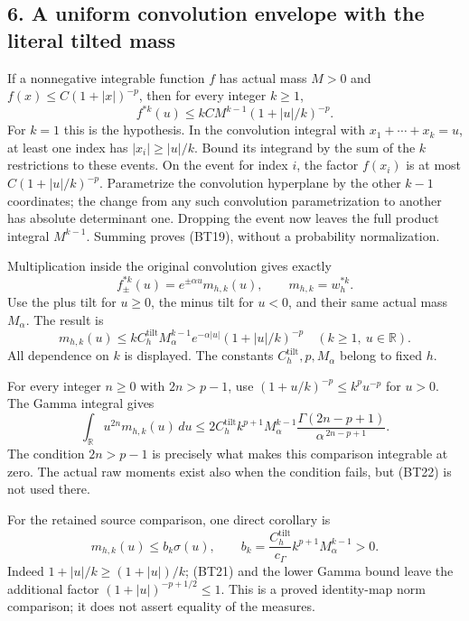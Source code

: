 \subsection{6. A uniform convolution envelope with the literal tilted mass}\label{GraphV2:a-uniform-convolution-envelope-with-the-literal-tilted-mass}

If a nonnegative integrable function \(f\) has actual mass \(M>0\) and \(f(x)\le C(1+|x|)^{-p}\), then for every integer \(k\ge1\), \[
\boxed{
f^{*k}(u)\le kCM^{k-1}(1+|u|/k)^{-p}.}
\tag{BT19}
\] For \(k=1\) this is the hypothesis. In the convolution integral with \(x_1+\cdots+x_k=u\), at least one index has \(|x_i|\ge|u|/k\). Bound its integrand by the sum of the \(k\) restrictions to these events. On the event for index \(i\), the factor \(f(x_i)\) is at most \(C(1+|u|/k)^{-p}\). Parametrize the convolution hyperplane by the other \(k-1\) coordinates; the change from any such convolution parametrization to another has absolute determinant one. Dropping the event now leaves the full product integral \(M^{k-1}\). Summing proves (BT19), without a probability normalization.

Multiplication inside the original convolution gives exactly \[
f_\pm^{*k}(u)=e^{\pm\alpha u}m_{h,k}(u),
\qquad m_{h,k}=w_h^{*k}.
\tag{BT20}
\] Use the plus tilt for \(u\ge0\), the minus tilt for \(u<0\), and their same actual mass \(M_\alpha\). The result is \[
\boxed{
m_{h,k}(u)\le
kC_h^{\mathrm{tilt}}M_\alpha^{k-1}
e^{-\alpha|u|}(1+|u|/k)^{-p}}
\quad(k\ge1,\ u\in\mathbb{R}).
\tag{BT21}
\] All dependence on \(k\) is displayed. The constants \(C_h^{\mathrm{tilt}},p,M_\alpha\) belong to fixed \(h\).

For every integer \(n\ge0\) with \(2n>p-1\), use \((1+u/k)^{-p}\le k^pu^{-p}\) for \(u>0\). The Gamma integral gives \[
\boxed{
\int_{\mathbb{R}}u^{2n}m_{h,k}(u)\,du
\le 2C_h^{\mathrm{tilt}}k^{p+1}M_\alpha^{k-1}
\frac{\Gamma(2n-p+1)}{\alpha^{\,2n-p+1}}.}
\tag{BT22}
\] The condition \(2n>p-1\) is precisely what makes this comparison integrable at zero. The actual raw moments exist also when the condition fails, but (BT22) is not used there.

For the retained source comparison, one direct corollary is \[
m_{h,k}(u)\le b_k\sigma(u),\qquad
b_k=\frac{C_h^{\mathrm{tilt}}}{c_\Gamma}
k^{p+1}M_\alpha^{k-1}>0.
\tag{BT23}
\] Indeed \(1+|u|/k\ge(1+|u|)/k\); (BT21) and the lower Gamma bound leave the additional factor \((1+|u|)^{-p+1/2}\le1\). This is a proved identity-map norm comparison; it does not assert equality of the measures.

